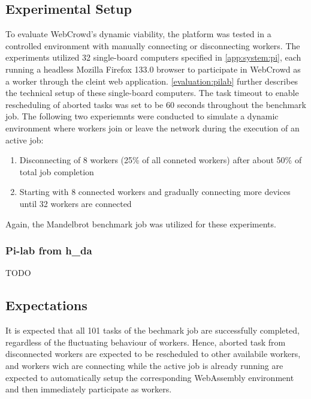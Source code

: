 \subsection{Experimental Setup}
To evaluate WebCrowd's dynamic viability, the platform was tested in a controlled environment with manually connecting or disconnecting workers. The experiments utilized 32 single-board computers specified in \autoref{app:system:pi}, each running a headless Mozilla Firefox 133.0 \cite{background:firefox2} browser to participate in WebCrowd as a worker through the cleint web application. \autoref{evaluation:pilab} further describes the technical setup of these single-board computers. The task timeout to enable rescheduling of aborted tasks was set to be 60 seconds throughout the benchmark job. The following two experiemnts were conducted to simulate a dynamic environment where workers join or leave the network during the execution of an active job:
\begin{enumerate}
    \item Disconnecting of 8 workers (25\% of all conneted workers) after about 50\% of total job completion 
    \item Starting with 8 connected workers and gradually connecting more devices until 32 workers are connected
\end{enumerate}
Again, the Mandelbrot benchmark job was utilized for these experiments.

\subsubsection{Pi-lab from h\_da}
\label{evaluation:pilab}
TODO

\subsection{Expectations}
It is expected that all 101 tasks of the bechmark job are successfully completed, regardless of the fluctuating behaviour of workers. Hence, aborted task from disconnected workers are expected to be rescheduled to other availabile workers, and workers wich are connecting while the active job is already running are expected to automatically setup the corresponding WebAssembly environment and then immediately participate as workers.

